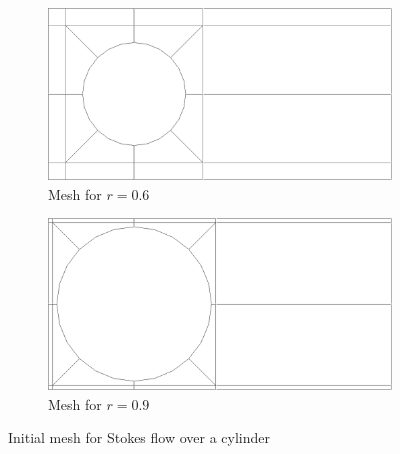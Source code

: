 \documentclass[Proposal.tex]{subfiles}
\begin{document}
\begin{figure}[p]
\centering
\begin{subfigure}[t]{0.6\textwidth}
\centering
\includegraphics[width=\textwidth]{figs/StokesCylinder/mesh6_0.png}
\caption{Mesh for $r=0.6$}
\label{fig:stokesMesh6}
\end{subfigure}
\begin{subfigure}[t]{0.6\textwidth}
\centering
\includegraphics[width=\textwidth]{figs/StokesCylinder/mesh9_0.png}
\caption{Mesh for $r=0.9$}
\label{fig:stokesMesh9}
\end{subfigure}
\caption{Initial mesh for Stokes flow over a cylinder}
\label{fig:stokesMesh}
\end{figure}
\end{document}
